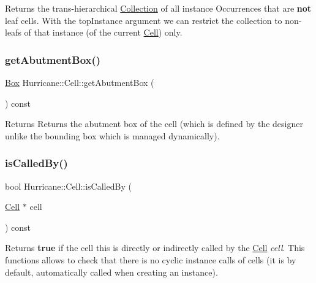 Returns the trans-\/hierarchical \mbox{\hyperlink{classHurricane_1_1Collection}{Collection}} of all instance Occurrences that are {\bfseries not} leaf cells. With the {\ttfamily top\+Instance} argument we can restrict the collection to non-\/leafs of that instance (of the current \mbox{\hyperlink{classHurricane_1_1Cell}{Cell}}) only. \mbox{\label{classHurricane_1_1Cell_a142360ca7b3c1c637894f5b9a2cac069}} 
\subsubsection{\texorpdfstring{get\+Abutment\+Box()}{getAbutmentBox()}}
{\footnotesize\ttfamily \mbox{\hyperlink{classHurricane_1_1Box}{Box}} Hurricane\+::\+Cell\+::get\+Abutment\+Box (\begin{DoxyParamCaption}{ }\end{DoxyParamCaption}) const\hspace{0.3cm}{\ttfamily [inline]}}

Returns Returns the abutment box of the cell (which is defined by the designer unlike the bounding box which is managed dynamically). \mbox{\label{classHurricane_1_1Cell_a239354e1b4ad9b751abf5a064e43b0e6}} 
\subsubsection{\texorpdfstring{is\+Called\+By()}{isCalledBy()}}
{\footnotesize\ttfamily bool Hurricane\+::\+Cell\+::is\+Called\+By (\begin{DoxyParamCaption}\item[{\mbox{\hyperlink{classHurricane_1_1Cell}{Cell}} $\ast$}]{cell }\end{DoxyParamCaption}) const}

Returns {\bfseries true} if the cell {\ttfamily this} is directly or indirectly called by the \mbox{\hyperlink{classHurricane_1_1Cell}{Cell}} {\itshape cell}. This functions allows to check that there is no cyclic instance calls of cells (it is by default, automatically called when creating an instance). \mbox{\label{classHurricane_1_1Cell_aac4e9218b7806f3a0f2d5a55f00abd69}} 
